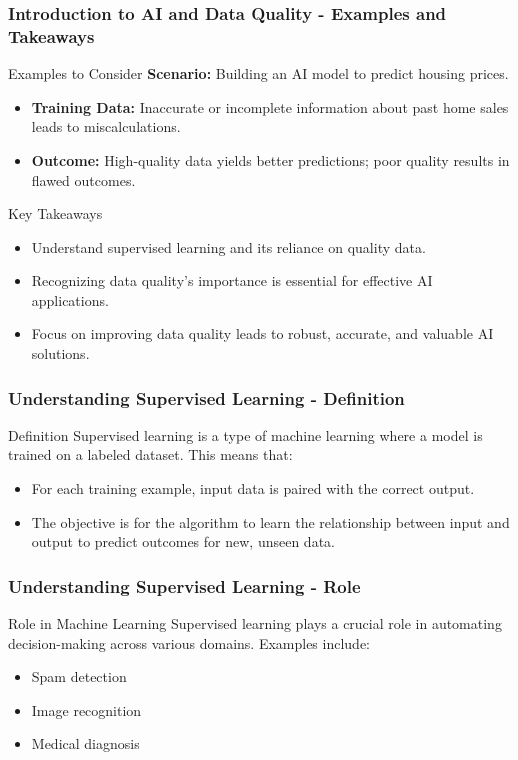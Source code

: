 \documentclass[aspectratio=169]{beamer}
\begin{document}
\begin{frame}[fragile]
    \frametitle{Introduction to AI and Data Quality - Examples and Takeaways}
    \begin{block}{Examples to Consider}
        \textbf{Scenario:} Building an AI model to predict housing prices.
        \begin{itemize}
            \item \textbf{Training Data:} Inaccurate or incomplete information about past home sales leads to miscalculations.
            \item \textbf{Outcome:} High-quality data yields better predictions; poor quality results in flawed outcomes.
        \end{itemize}
    \end{block}
    
    \begin{block}{Key Takeaways}
        \begin{itemize}
            \item Understand supervised learning and its reliance on quality data.
            \item Recognizing data quality's importance is essential for effective AI applications.
            \item Focus on improving data quality leads to robust, accurate, and valuable AI solutions.
        \end{itemize}
    \end{block}
\end{frame}

\begin{frame}[fragile]
    \frametitle{Understanding Supervised Learning - Definition}
    \begin{block}{Definition}
        Supervised learning is a type of machine learning where a model is trained on a labeled dataset. This means that:
        \begin{itemize}
            \item For each training example, input data is paired with the correct output.
            \item The objective is for the algorithm to learn the relationship between input and output to predict outcomes for new, unseen data.
        \end{itemize}
    \end{block}
\end{frame}

\begin{frame}[fragile]
    \frametitle{Understanding Supervised Learning - Role}
    \begin{block}{Role in Machine Learning}
        Supervised learning plays a crucial role in automating decision-making across various domains. Examples include:
        \begin{itemize}
            \item Spam detection
            \item Image recognition
            \item Medical diagnosis
        \end{itemize}
    \end{block}
\end{frame}
\end{document}
